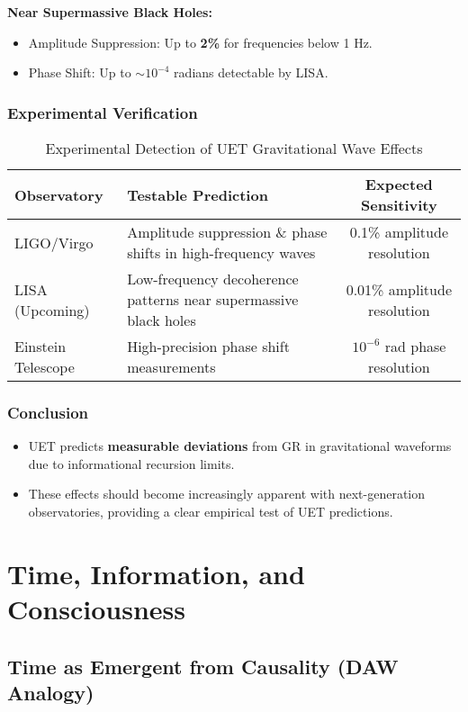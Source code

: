 \documentclass[12pt,a4paper]{article}
\begin{document}
\textbf{Near Supermassive Black Holes:}
\begin{itemize}
    \item Amplitude Suppression: Up to \textbf{2\%} for frequencies below 1 Hz.
    \item Phase Shift: Up to \(\sim 10^{-4}\) radians detectable by LISA.
\end{itemize}

\subsubsection*{Experimental Verification}

\begin{table}[h]
\centering
\begin{tabular}{|l|l|c|}
\hline
\textbf{Observatory} & \textbf{Testable Prediction} & \textbf{Expected Sensitivity} \\
\hline
LIGO/Virgo & Amplitude suppression \& phase shifts in high-frequency waves & 0.1\% amplitude resolution \\
LISA (Upcoming) & Low-frequency decoherence patterns near supermassive black holes & 0.01\% amplitude resolution \\
Einstein Telescope & High-precision phase shift measurements & \(10^{-6}\) rad phase resolution \\
\hline
\end{tabular}
\caption{Experimental Detection of UET Gravitational Wave Effects}
\end{table}

\subsubsection*{Conclusion}

\begin{itemize}
    \item UET predicts \textbf{measurable deviations} from GR in gravitational waveforms due to informational recursion limits.
    \item These effects should become increasingly apparent with next-generation observatories, providing a clear empirical test of UET predictions.
\end{itemize}
\section{Time, Information, and Consciousness}

\subsection{Time as Emergent from Causality (DAW Analogy)}
\end{document}

